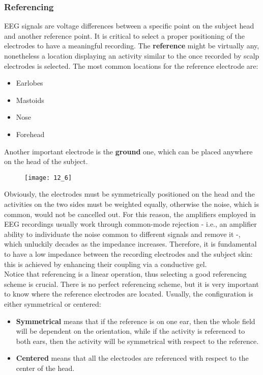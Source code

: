\subsubsection{Referencing}
EEG signals are voltage differences between a specific point on the subject head and another
reference point. It is critical to select a proper positioning of the electrodes to have a
meaningful recording. The \textbf{reference} might be virtually any, nonetheless a location
displaying an activity similar to the once recorded by scalp electrodes is selected.
The most common locations for the reference electrode are:
\begin{itemize}
    \item Earlobes
    \item Mastoids
    \item Nose
    \item Forehead
\end{itemize}
Another important electrode is the \textbf{ground} one, which can be placed anywhere on the head of the
subject.
\begin{figure}[H]
    \centering
    \texttt{[image: 12\_6]}
\end{figure}
Obviously, the electrodes must be symmetrically positioned on the head and the activities on the two sides
must be weighted equally, otherwise the noise, which is common, would not be cancelled out.
For this reason, the amplifiers employed in EEG recordings usually work through common-mode rejection
- i.e., an amplifier ability to individuate the noise common to different signals and remove
it -, which unluckily decades as the impedance increases. Therefore, it is fundamental to
have a low impedance between the recording electrodes and the subject skin: this is achieved
by enhancing their coupling via a conductive gel.\\
Notice that referencing is a linear operation, thus selecting a good referencing scheme is
crucial. There is no perfect referencing scheme, but it is very important to know where the reference electrodes
are located. Usually, the configuration is either symmetrical or centered:
\begin{itemize}
    \item \textbf{Symmetrical} means that if the reference is on one ear, then the whole field will be dependent
          on the orientation, while if the activity is referenced to both ears, then the activity will be symmetrical
          with respect to the reference.
    \item \textbf{Centered} means that all the electrodes are referenced with respect to the center of the head.
\end{itemize}
